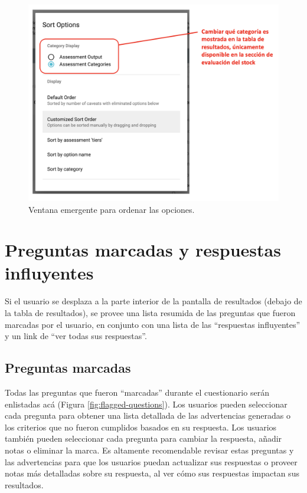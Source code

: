 \documentclass[
  11pt,
]{book}
\begin{document}
\begin{figure}

{\centering \includegraphics[width=0.5\linewidth]{images/filter-and-sorting-assessment-es} 

}

\caption{Ventana emergente para ordenar las opciones.}\label{fig:filter-and-sorting}
\end{figure}

\hypertarget{Bookmark-Influential}{%
\section{Preguntas marcadas y respuestas influyentes}\label{Bookmark-Influential}}

Si el usuario se desplaza a la parte interior de la pantalla de resultados (debajo de la tabla de resultados), se provee una lista resumida de las preguntas que fueron marcadas por el usuario, en conjunto con una lista de las ``respuestas influyentes'' y un link de ``ver todas sus respuestas''.

\hypertarget{preguntas-marcadas}{%
\subsection{Preguntas marcadas}\label{preguntas-marcadas}}

Todas las preguntas que fueron ``marcadas'' durante el cuestionario serán enlistadas acá (Figura \ref{fig:flagged-questions}). Los usuarios pueden seleccionar cada pregunta para obtener una lista detallada de las advertencias generadas o los criterios que no fueron cumplidos basados en su respuesta. Los usuarios también pueden seleccionar cada pregunta para cambiar la respuesta, añadir notas o eliminar la marca. Es altamente recomendable revisar estas preguntas y las advertencias para que los usuarios puedan actualizar sus respuestas o proveer notas más detalladas sobre su respuesta, al ver cómo sus respuestas impactan sus resultados.
\end{document}
